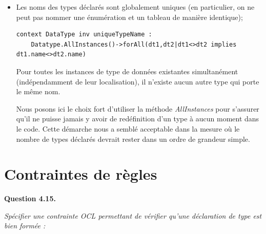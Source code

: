 \documentclass[oneside,a4paper]{book}
\begin{document}
\begin{itemize}
    \item Les noms des types déclarés sont globalement uniques (en particulier, on ne peut pas nommer une énumération et un tableau de manière identique);
    \begin{lstlisting}
context DataType inv uniqueTypeName : 
    Datatype.AllInstances()->forAll(dt1,dt2|dt1<>dt2 implies dt1.name<>dt2.name)
    \end{lstlisting}
    Pour toutes les instances de type de données existantes simultanément (indépendamment de leur localisation), il n'existe aucun autre type qui porte le même nom.
    
    \begin{tcolorbox}
        Nous posons ici le choix fort d'utiliser la méthode \textit{AllInstances} pour s'assurer qu'il ne puisse jamais y avoir de redéfinition d'un type à aucun moment dans le code. Cette démarche nous a semblé acceptable dans la mesure où le nombre de types déclarés devrait rester dans un ordre de grandeur simple.
    \end{tcolorbox}
    
\end{itemize}

\section{Contraintes de règles}

\textbf{Question 4.15.}\label{Question 4.15.}\newline

\nopagebreak 

\textit{Spécifier une contrainte OCL permettant de vérifier qu'une déclaration de type est bien formée :}

\nopagebreak
\end{document}
